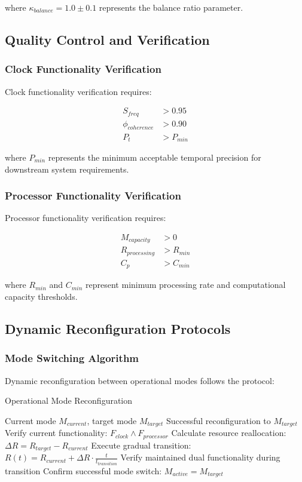 where $\kappa_{balance} = 1.0 \pm 0.1$ represents the balance ratio parameter.

\subsection{Quality Control and Verification}

\subsubsection{Clock Functionality Verification}

Clock functionality verification requires:

\begin{align}
S_{freq} &> 0.95 \\
\phi_{coherence} &> 0.90 \\
P_t &> P_{min}
\end{align}

where $P_{min}$ represents the minimum acceptable temporal precision for downstream system requirements.

\subsubsection{Processor Functionality Verification}

Processor functionality verification requires:

\begin{align}
M_{capacity} &> 0 \\
R_{processing} &> R_{min} \\
C_p &> C_{min}
\end{align}

where $R_{min}$ and $C_{min}$ represent minimum processing rate and computational capacity thresholds.

\subsection{Dynamic Reconfiguration Protocols}

\subsubsection{Mode Switching Algorithm}

Dynamic reconfiguration between operational modes follows the protocol:

\begin{algorithm}[H]
\caption{Operational Mode Reconfiguration}
\begin{algorithmic}[1]
\REQUIRE Current mode $M_{current}$, target mode $M_{target}$
\ENSURE Successful reconfiguration to $M_{target}$
\STATE Verify current functionality: $F_{clock} \land F_{processor}$
\STATE Calculate resource reallocation: $\Delta R = R_{target} - R_{current}$
\STATE Execute gradual transition: $R(t) = R_{current} + \Delta R \cdot \frac{t}{t_{transition}}$
\STATE Verify maintained dual functionality during transition
\STATE Confirm successful mode switch: $M_{active} = M_{target}$
\end{algorithmic}
\end{algorithm}


